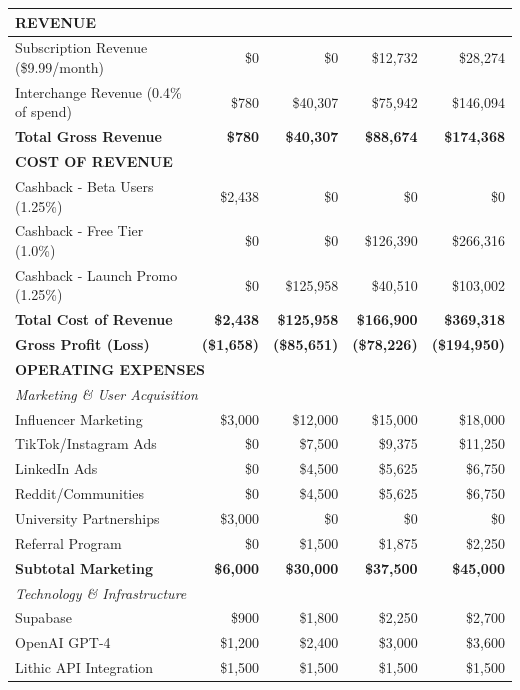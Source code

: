 \documentclass[11pt,letterpaper]{article}
\begin{document}
\begin{center}
\begin{longtable}{|l|r|r|r|r|}
\multicolumn{5}{|l|}{\textbf{REVENUE}} \\
\hline
Subscription Revenue (\$9.99/month) & \$0 & \$0 & \$12,732 & \$28,274 \\
Interchange Revenue (0.4\% of spend) & \$780 & \$40,307 & \$75,942 & \$146,094 \\
\hline
\textbf{Total Gross Revenue} & \textbf{\$780} & \textbf{\$40,307} & \textbf{\$88,674} & \textbf{\$174,368} \\
\hline
\multicolumn{5}{|l|}{\textbf{COST OF REVENUE}} \\
\hline
Cashback - Beta Users (1.25\%) & \$2,438 & \$0 & \$0 & \$0 \\
Cashback - Free Tier (1.0\%) & \$0 & \$0 & \$126,390 & \$266,316 \\
Cashback - Launch Promo (1.25\%) & \$0 & \$125,958 & \$40,510 & \$103,002 \\
\hline
\textbf{Total Cost of Revenue} & \textbf{\$2,438} & \textbf{\$125,958} & \textbf{\$166,900} & \textbf{\$369,318} \\
\hline
\textbf{Gross Profit (Loss)} & \textbf{(\$1,658)} & \textbf{(\$85,651)} & \textbf{(\$78,226)} & \textbf{(\$194,950)} \\
\hline
\multicolumn{5}{|l|}{\textbf{OPERATING EXPENSES}} \\
\hline
\multicolumn{5}{|l|}{\textit{Marketing \& User Acquisition}} \\
\hline
Influencer Marketing & \$3,000 & \$12,000 & \$15,000 & \$18,000 \\
TikTok/Instagram Ads & \$0 & \$7,500 & \$9,375 & \$11,250 \\
LinkedIn Ads & \$0 & \$4,500 & \$5,625 & \$6,750 \\
Reddit/Communities & \$0 & \$4,500 & \$5,625 & \$6,750 \\
University Partnerships & \$3,000 & \$0 & \$0 & \$0 \\
Referral Program & \$0 & \$1,500 & \$1,875 & \$2,250 \\
\textbf{Subtotal Marketing} & \textbf{\$6,000} & \textbf{\$30,000} & \textbf{\$37,500} & \textbf{\$45,000} \\
\hline
\multicolumn{5}{|l|}{\textit{Technology \& Infrastructure}} \\
\hline
Supabase & \$900 & \$1,800 & \$2,250 & \$2,700 \\
OpenAI GPT-4 & \$1,200 & \$2,400 & \$3,000 & \$3,600 \\
Lithic API Integration & \$1,500 & \$1,500 & \$1,500 & \$1,500 \\

\end{longtable}
\end{center}
\end{document}
